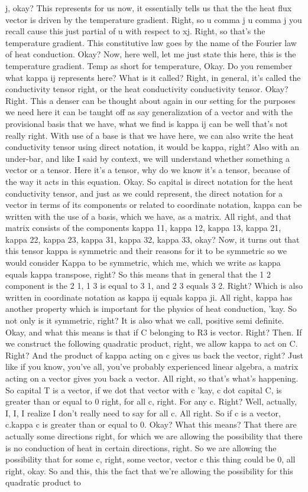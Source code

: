 \documentclass[10pt]{article}
\begin{document}
j, okay? This represents for us now, it essentially tells us that the the heat flux vector is driven by the temperature gradient. Right, so u comma j u comma j you recall cause this just partial of u with respect to xj. Right, so that's the temperature gradient. This constitutive law goes by the name of the Fourier law of heat conduction. Okay? Now, here well, let me just state this here, this is the temperature gradient. Temp as short for temperature, Okay. Do you remember what kappa ij represents here? What is it called? Right, in general, it's called the conductivity tensor right, or the heat conductivity conductivity tensor. Okay? Right. This a denser can be thought about again in our setting for the purposes we need here it can be taught off as say generalization of a vector and with the provisional basis that we have, what we find is kappa ij can be well that's not really right. With use of a base is that we have here, we can also write the heat conductivity tensor using direct notation, it would be kappa, right? Also with an under-bar, and like I said by context, we will understand whether something a vector or a tensor. Here it's a tensor, why do we know it's a tensor, because of the way it acts in this equation. Okay. So capital is direct notation for the heat conductivity tensor, and just as we could represent, the direct notation for a vector in terms of its components or related to coordinate notation, kappa can be written with the use of a basis, which we have, as a matrix. All right, and that matrix consists of the components kappa 11, kappa 12, kappa 13, kappa 21, kappa 22, kappa 23, kappa 31, kappa 32, kappa 33, okay? Now, it turns out that this tensor kappa is symmetric and their reasons for it to be symmetric so we would consider Kappa to be symmetric, which me, which we write as kappa equals kappa transpose, right? So this means that in general that the 1 2 component is the 2 1, 1 3 is equal to 3 1, and 2 3 equals 3 2. Right? Which is also written in coordinate notation as kappa ij equals kappa ji. All right, kappa has another property which is important for the physics of heat conduction, 'kay. So not only is it symmetric, right? It is also what we call, positive semi definite. Okay, and what this means is that if C belonging to R3 is vector. Right? Then. If we construct the following quadratic product, right, we allow kappa to act on C. Right? And the product of kappa acting on c gives us back the vector, right? Just like if you know, you've all, you've probably experienced linear algebra, a matrix acting on a vector gives you back a vector. All right, so that's what's happening. So capital T is a vector, if we dot that vector with c 'kay, c dot capital C, is greater than or equal to 0 right, for all c, right. For any c. Right? Well, actually, I, I, I realize I don't really need to say for all c. All right. So if c is a vector, c.kappa c is greater than or equal to 0. Okay? What this means? That there are actually some directions right, for which we are allowing the possibility that there is no conduction of heat in certain directions, right. So we are allowing the possibility that for some c, right, some vector, vector c this thing could be 0, all right, okay. So and this, this the fact that we're allowing the possibility for this quadratic product to 
\end{document}
